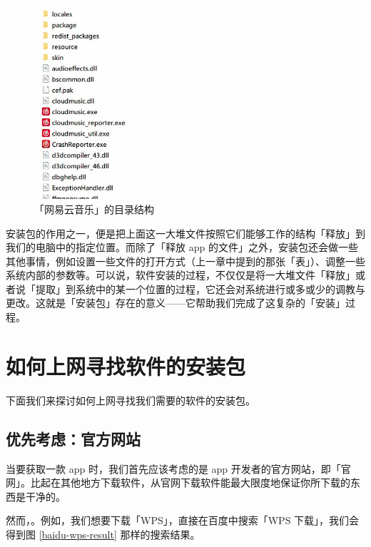 \begin{figure}[htb!]
  \centering
  \includegraphics[width=5cm]{assets/Netease_cloud_music_files.jpg}
  \caption{「网易云音乐」的目录结构}
  \label{ncm-files}
\end{figure}

安装包的作用之一，便是把上面这一大堆文件按照它们能够工作的结构「释放」到我们的电脑中的指定位置。而除了「释放 app 的文件」之外，安装包还会做一些其他事情，例如设置一些文件的打开方式（上一章中提到的那张「表」）、调整一些系统内部的参数等。可以说，软件安装的过程，不仅仅是将一大堆文件「释放」或者说「提取」到系统中的某一个位置的过程，它还会对系统进行或多或少的调教与更改。这就是「安装包」存在的意义——它帮助我们完成了这复杂的「安装」过程。

\section{如何上网寻找软件的安装包}

下面我们来探讨如何上网寻找我们需要的软件的安装包。

\subsection{优先考虑：官方网站}

当要获取一款 app 时，我们首先应该考虑的是 app 开发者的官方网站，即「官网」。比起在其他地方下载软件，从官网下载软件能最大限度地保证你所下载的东西是干净的。

然而，。例如，我们想要下载「WPS」，直接在百度中搜索「WPS 下载」，我们会得到图 \ref{baidu-wps-result} 那样的搜索结果。

